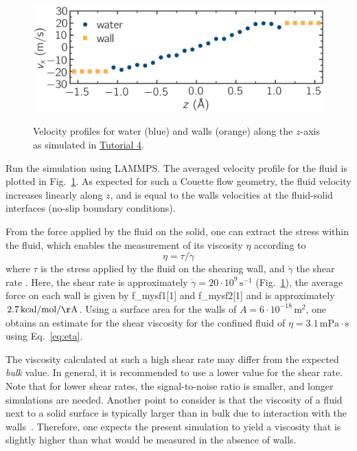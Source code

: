 \documentclass[9pt,tutorial]{livecoms}
\newcommand{\lmpcmd}[1]{\colorbox{listing}{\textcolor{command}{\small{#1}}}} %
\begin{document}
\begin{figure}
\centering
\includegraphics[width=\linewidth]{NANOSHEAR-profiles}\\[-2ex]
\caption{Velocity profiles for water (blue) and walls (orange) along the $z$-axis as
simulated in \hyperref[sheared-confined-label]{Tutorial 4}.}
\label{fig:NANOSHEAR-profiles}
\end{figure}

Run the simulation using LAMMPS.  The averaged velocity
profile for the fluid is plotted in Fig.~\ref{fig:NANOSHEAR-profiles}.
As expected for such a Couette flow geometry, the fluid velocity increases
linearly along $z$, and is equal to the walls velocities at the fluid-solid
interfaces (no-slip boundary conditions).

From the force applied by the fluid on the solid, one can extract the stress
within the fluid, which enables the measurement of its viscosity $\eta$
according to
\begin{equation}
\eta = \tau / \dot{\gamma}
\label{eq:eta}
\end{equation}
where $\tau$ is the stress applied by
the fluid on the shearing wall, and $\dot{\gamma}$ the shear rate
\cite{gravelle2021violations}.  Here, the shear rate is
approximately $\dot{\gamma} = 20 \cdot 10^9\,\text{s}^{-1}$ (Fig.~\ref{fig:NANOSHEAR-profiles}),
the average force on each wall is given by \lmpcmd{f\_mysf1[1]} and \lmpcmd{f\_mysf2[1]}
and is approximately $2.7\,\mathrm{kcal/mol/\AA{}}$. %
Using a surface area
for the walls of $A = 6 \cdot 10^{-18}\,\text{m}^2$, one obtains an estimate for
the shear viscosity for the confined fluid of $\eta = 3.1\,\mathrm{mPa\cdot s}$ using Eq.~\eqref{eq:eta}.

\begin{note}
The viscosity calculated at such a high shear rate may differ from the expected
\emph{bulk} value.  In general, it is recommended to use a lower value for the
shear rate.  Note that for lower shear rates, the signal-to-noise ratio is
smaller, and longer simulations are needed.  Another point to consider
is that the viscosity of a fluid next to a solid surface is typically larger
than in bulk due to interaction with the walls~\cite{wolde-kidanInterplayInterfacialViscosity2021}.
Therefore, one expects the present simulation to yield a viscosity that is slightly
higher than what would be measured in the absence of walls.
\end{note}
\end{document}
